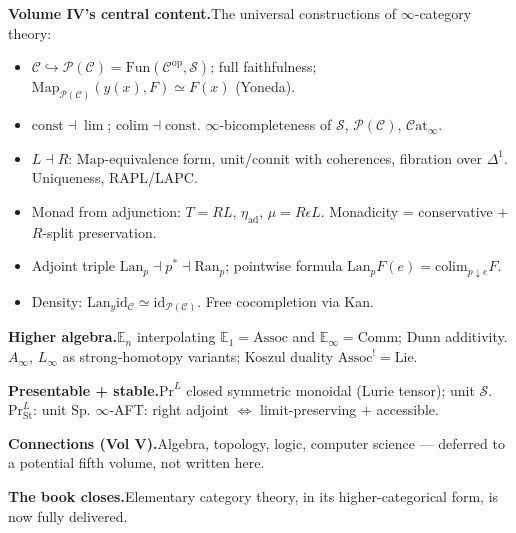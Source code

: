\begin{formalrestatement}
\textbf{Volume IV's central content.}\quad The universal constructions
of $\infty$-category theory:
\begin{itemize}
  \item $\mathcal{C} \hookrightarrow \mathcal{P}(\mathcal{C}) =
        \mathrm{Fun}(\mathcal{C}^{\mathrm{op}}, \mathcal{S})$; full
        faithfulness; $\mathrm{Map}_{\mathcal{P}(\mathcal{C})}(y(x), F)
        \simeq F(x)$ (Yoneda).
  \item $\mathrm{const} \dashv \lim$; $\mathrm{colim} \dashv \mathrm{const}$.
        $\infty$-bicompleteness of $\mathcal{S}$, $\mathcal{P}(\mathcal{C})$,
        $\mathcal{C}\mathrm{at}_\infty$.
  \item $L \dashv R$: $\mathrm{Map}$-equivalence form, unit/counit
        with coherences, fibration over $\Delta^1$. Uniqueness, RAPL/LAPC.
  \item Monad from adjunction: $T = RL$, $\eta_{\mathrm{ad}}$, $\mu = R\epsilon L$.
        Monadicity = conservative + $R$-split preservation.
  \item Adjoint triple $\mathrm{Lan}_p \dashv p^* \dashv \mathrm{Ran}_p$;
        pointwise formula $\mathrm{Lan}_p F (e) = \mathrm{colim}_{p \downarrow e} F$.
  \item Density: $\mathrm{Lan}_y \mathrm{id}_\mathcal{C} \simeq
        \mathrm{id}_{\mathcal{P}(\mathcal{C})}$. Free cocompletion via Kan.
\end{itemize}

\medskip
\textbf{Higher algebra.}\quad $\mathbb{E}_n$ interpolating $\mathbb{E}_1
= \mathrm{Assoc}$ and $\mathbb{E}_\infty = \mathrm{Comm}$; Dunn
additivity. $A_\infty$, $L_\infty$ as strong-homotopy variants;
Koszul duality $\mathrm{Assoc}^! = \mathrm{Lie}$.

\medskip
\textbf{Presentable + stable.}\quad $\mathrm{Pr}^L$ closed symmetric
monoidal (Lurie tensor); unit $\mathcal{S}$. $\mathrm{Pr}^L_{\mathrm{St}}$:
unit $\mathrm{Sp}$. $\infty$-AFT: right adjoint $\iff$ limit-preserving
$+$ accessible.

\medskip
\textbf{Connections (Vol V).}\quad Algebra, topology, logic, computer
science — deferred to a potential fifth volume, not written here.

\medskip
\textbf{The book closes.}\quad Elementary category theory, in its
higher-categorical form, is now fully delivered.
\end{formalrestatement}
